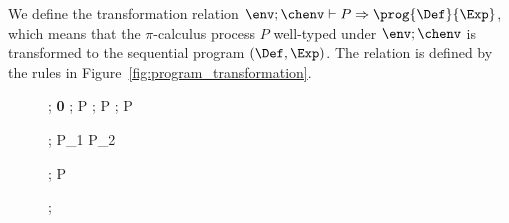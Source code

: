 We define the transformation relation
$\env; \chenv \vdash P \Rightarrow \prog{\Def}{\Exp}$,
which means that the \(\pi\)-calculus process \(P\) well-typed
under \(\env;\chenv\) is transformed to the sequential program \((\Def,\Exp)\).
The relation is defined by the rules in Figure~\ref{fig:program_transformation}.
\begin{figure}[tb]
  \infrule[SX-Nil]{}
          {\env; \chenv \vdash \textbf{0} \Rightarrow
            }
          \vspace*{1ex}
            {\env; \chenv \vdash {}P \Rightarrow
              }
          \vspace*{1ex}
{\env; \chenv \vdash {}P \Rightarrow
   {\skipexp}}
\vspace*{1ex}
{\env; \chenv \vdash {}P \Rightarrow
  }

{\env; \chenv \vdash P_1 \mid P_2 \Rightarrow {}}

\vspace*{1ex}
        {\env; \chenv \vdash {}P \Rightarrow \prog{\Def}{\Exp}}
          \vspace*{1ex}

{\env; \chenv \vdash {} \Rightarrow
  }


\end{figure}

